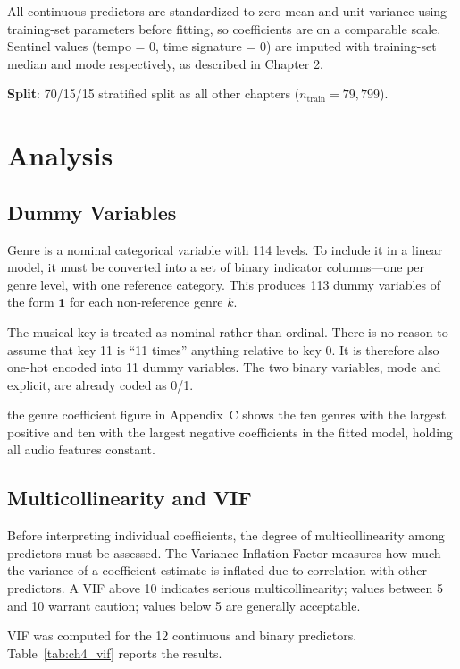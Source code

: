 \documentclass[12pt, oneside]{book}
\begin{document}
All continuous predictors are standardized to zero mean and unit variance using training-set parameters before fitting, so coefficients are on a comparable scale. Sentinel values (tempo = 0, time signature = 0) are imputed with training-set median and mode respectively, as described in Chapter 2.
 
\textbf{Split}: 70/15/15 stratified split as all other chapters ($n_{\text{train}} = 79{,}799$).
 
\section{Analysis}
 
\subsection{Dummy Variables}
 
Genre is a nominal categorical variable with 114 levels. To include it in a linear model, it must be converted into a set of binary indicator columns—one per genre level, with one reference category. This produces 113 dummy variables of the form $\mathbf{1}$ for each non-reference genre $k$.
 
The musical key is treated as nominal rather than ordinal. There is no reason to assume that key 11 is ``11 times'' anything relative to key 0. It is therefore also one-hot encoded into 11 dummy variables. The two binary variables, mode and explicit, are already coded as 0/1.
 
the genre coefficient figure in Appendix~C shows the ten genres with the largest positive and ten with the largest negative coefficients in the fitted model, holding all audio features constant.
 
 
\subsection{Multicollinearity and VIF}
 
Before interpreting individual coefficients, the degree of multicollinearity among predictors must be assessed. The Variance Inflation Factor measures how much the variance of a coefficient estimate is inflated due to correlation with other predictors. A VIF above 10 indicates serious multicollinearity; values between 5 and 10 warrant caution; values below 5 are generally acceptable.
 
VIF was computed for the 12 continuous and binary predictors. Table~\ref{tab:ch4_vif} reports the results.
 
\end{document}
